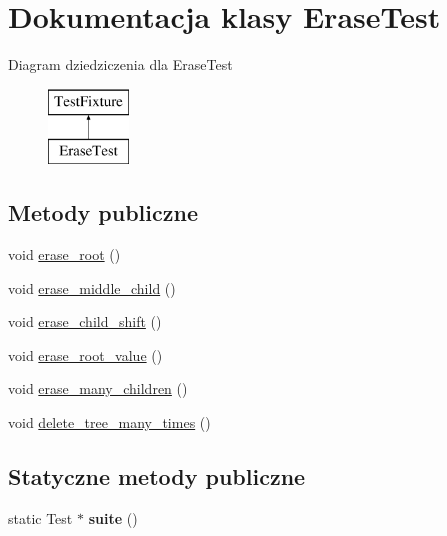 \hypertarget{class_erase_test}{}\section{Dokumentacja klasy Erase\+Test}
\label{class_erase_test}
Diagram dziedziczenia dla Erase\+Test\begin{figure}[H]
\begin{center}
\leavevmode
\includegraphics[height=2.000000cm]{class_erase_test}
\end{center}
\end{figure}
\subsection*{Metody publiczne}
\begin{DoxyCompactItemize}
\item 
void \hyperlink{class_erase_test_aa245715a2bbbcf0bd6abcca1a0992055}{erase\+\_\+root} ()
\item 
void \hyperlink{class_erase_test_ae6bc0aa4ecaa1f2966a0e4f971d229d1}{erase\+\_\+middle\+\_\+child} ()
\item 
void \hyperlink{class_erase_test_a0897542be38d32150b6c080449bf0b2d}{erase\+\_\+child\+\_\+shift} ()
\item 
void \hyperlink{class_erase_test_a3b1971101ff3dc813242f02a0cff68bf}{erase\+\_\+root\+\_\+value} ()
\item 
void \hyperlink{class_erase_test_a7c3b732833940974b289fd52f1190306}{erase\+\_\+many\+\_\+children} ()
\item 
void \hyperlink{class_erase_test_ac80cbc1c11f5ca0f218f0632b5b368b5}{delete\+\_\+tree\+\_\+many\+\_\+times} ()
\end{DoxyCompactItemize}
\subsection*{Statyczne metody publiczne}
\begin{DoxyCompactItemize}
\item 
\mbox{\label{class_erase_test_ae12b35171f770e9f26decc0edc4c3206}} 
static Test $\ast$ {\bfseries suite} ()
\end{DoxyCompactItemize}


